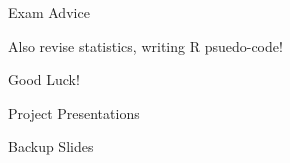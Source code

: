 \documentclass{beamer}
\begin{document}
\begin{frame}{Exam Advice}

Also revise statistics, writing R psuedo-code!

\end{frame}


\begin{frame}{Good Luck!}

\end{frame}



\begin{frame}{Project Presentations}

\end{frame}





\appendix
{}
\setcounter{finalframe}{\value{framenumber}}

\begin{frame}{Backup Slides}
\end{frame}




\setcounter{framenumber}{\value{finalframe}}
\end{document}
